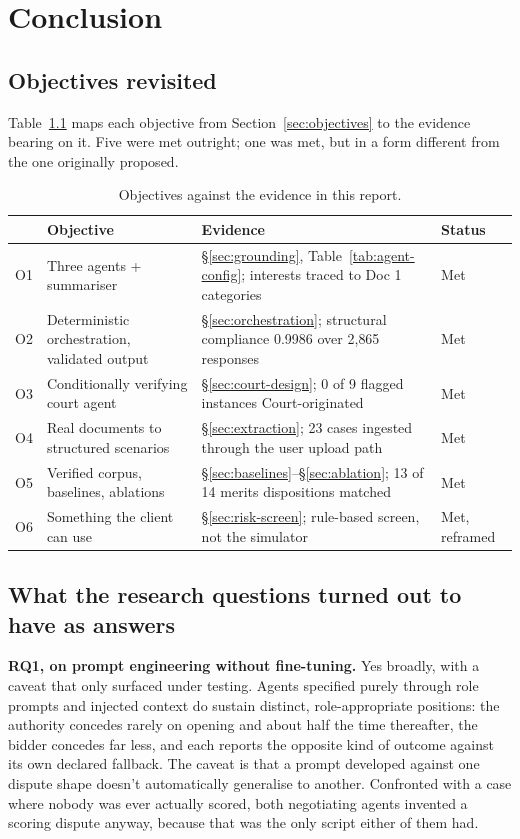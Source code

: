\chapter{Conclusion}
\label{ch:conclusion}

\section{Objectives revisited}

Table~\ref{tab:objectives} maps each objective from Section~\ref{sec:objectives}
to the evidence bearing on it. Five were met outright; one was met, but in a form
different from the one originally proposed.

\begin{table}[htbp]
\centering
\footnotesize
\caption[Objectives against evidence]{Objectives against the evidence in this
report.}
\label{tab:objectives}
\begin{tabular}{|c|l|p{5.5cm}|l|}
\hline
& \textbf{Objective} & \textbf{Evidence} & \textbf{Status} \\
\hline
O1 & Three agents + summariser & \S\ref{sec:grounding}, Table~\ref{tab:agent-config};
 interests traced to Doc 1 categories & Met \\
\hline
O2 & Deterministic orchestration, validated output & \S\ref{sec:orchestration};
 structural compliance 0.9986 over 2{,}865 responses & Met \\
\hline
O3 & Conditionally verifying court agent & \S\ref{sec:court-design};
 0 of 9 flagged instances Court-originated & Met \\
\hline
O4 & Real documents to structured scenarios & \S\ref{sec:extraction};
 23 cases ingested through the user upload path & Met \\
\hline
O5 & Verified corpus, baselines, ablations & \S\ref{sec:baselines}--\S\ref{sec:ablation};
 13 of 14 merits dispositions matched & Met \\
\hline
O6 & Something the client can use & \S\ref{sec:risk-screen};
 rule-based screen, not the simulator & Met, reframed \\
\hline
\end{tabular}
\end{table}

\section{What the research questions turned out to have as answers}

\textbf{RQ1, on prompt engineering without fine-tuning.} Yes broadly, with a
caveat that only surfaced under testing. Agents specified purely through role
prompts and injected context do sustain distinct, role-appropriate positions:
the authority concedes rarely on opening and about half the time thereafter, the
bidder concedes far less, and each reports the opposite kind of outcome against
its own declared fallback. The caveat is that a prompt developed against one
dispute shape doesn't automatically generalise to another. Confronted with a
case where nobody was ever actually scored, both negotiating agents invented a
scoring dispute anyway, because that was the only script either of them
had.

